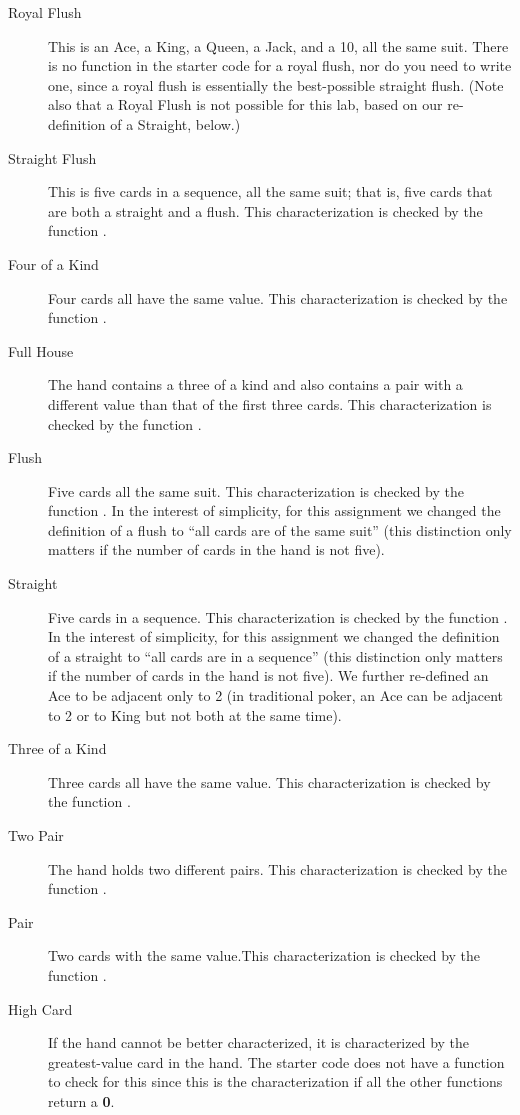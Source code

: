 \begin{description}
    \item[Royal Flush] This is an Ace, a King, a Queen, a Jack, and a 10, all the same suit.
    There is no function in the starter code for a royal flush, nor do you need to write one, since a royal flush is essentially the best-possible straight flush.
    (Note also that a Royal Flush is not possible for this lab, based on our re-definition of a Straight, below.)
    \item[Straight Flush] This is five cards in a sequence, all the same suit;
    that is, five cards that are both a straight and a flush.
    This characterization is checked by the function .
    \item[Four of a Kind] Four cards all have the same value.
    This characterization is checked by the function .
    \item[Full House] The hand contains a three of a kind and also contains a pair with a different value than that of the first three cards.
    This characterization is checked by the function .
    \item[Flush] Five cards all the same suit.
    This characterization is checked by the function .
    In the interest of simplicity, for this assignment we changed the definition of a flush to ``all cards are of the same suit'' (this distinction only matters if the number of cards in the hand is not five).
    \item[Straight] Five cards in a sequence.
    This characterization is checked by the function .
    In the interest of simplicity, for this assignment we changed the definition of a straight to ``all cards are in a sequence'' (this distinction only matters if the number of cards in the hand is not five).
    We further re-defined an Ace to be adjacent only to 2 (in traditional poker, an Ace can be adjacent to 2 or to King but not both at the same time).
    \item[Three of a Kind] Three cards all have the same value.
    This characterization is checked by the function .
    \item[Two Pair] The hand holds two different pairs.
    This characterization is checked by the function .
    \item[Pair] Two cards with the same value.This characterization is checked by
    the function .
    \item[High Card] If the hand cannot be better characterized, it is characterized by the greatest-value card in the hand.
    The starter code does not have a function to check for this since this is the characterization if all the other functions return a \textbf{0}.
\end{description}

